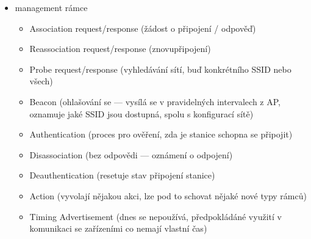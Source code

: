 \begin{itemize}
	\item management rámce
	\begin{itemize}
		\item Association request/response (žádost o připojení / odpověď)
		\item Reassociation request/response (znovupřipojení)
		\item Probe request/response (vyhledávání sítí, buď konkrétního SSID nebo všech)
		\item Beacon (ohlašování se --- vysílá se v pravidelných intervalech z AP, oznamuje jaké SSID jsou dostupná, spolu s konfigurací sítě)
		\item Authentication (proces pro ověření, zda je stanice schopna se připojit)
		\item Disassociation (bez odpovědi --- oznámení o odpojení)
		\item Deauthentication (resetuje stav připojení stanice)
		\item Action (vyvolají nějakou akci, lze pod to schovat nějaké nové typy rámců)
		\item Timing Advertisement (dnes se nepoužívá, předpokládáné využití v komunikaci se zařízeními co nemají vlastní čas)
	\end{itemize}
\end{itemize}

